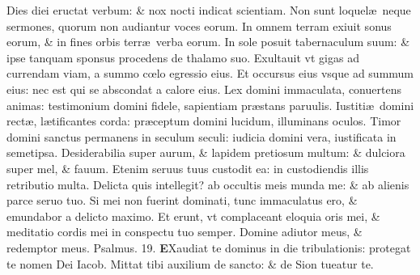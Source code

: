 \documentclass[a5paper,10pt]{book}
\def\ae{æ}
\def\oe{œ}
\begin{document}
\begin{multicols*}{2}
\newline \color{red} D\color{black}ies diei eructat verbum: \& nox nocti indicat scientiam.
\newline \color{red} N\color{black}on sunt loquel\ae \ neque sermones, quorum non audiantur voces eorum.
\newline \color{red} I\color{black}n omnem terram exiuit sonus eorum, \& in fines orbis terr\ae \ verba eorum.
\newline \color{red} I\color{black}n sole posuit tabernaculum suum: \& ipse tanquam sponsus procedens de thalamo suo.
\newline \color{red} E\color{black}xultauit vt gigas ad currendam viam, a summo c\oe lo egressio eius.
\newline \color{red} E\color{black}t occursus eius vsque ad summum eius: nec est qui se abscondat a calore eius.
\newline \color{red} L\color{black}ex domini immaculata, conuertens animas: testimonium domini fidele, sapientiam pr\ae stans paruulis.
\newline \color{red} I\color{black}ustiti\ae \ domini rect\ae , l\ae tificantes corda: pr\ae ceptum domini lucidum, illuminans oculos.
\newline \color{red} T\color{black}imor domini sanctus permanens in seculum seculi: iudicia domini vera, iustificata in semetipsa.
\newline \color{red} D\color{black}esiderabilia super aurum, \& lapidem pretiosum multum: \& dulciora super mel, \& fauum.
\newline \color{red} E\color{black}tenim seruus tuus custodit ea: in custodiendis illis retributio multa.
\newline \color{red} D\color{black}elicta quis intellegit? ab occultis meis munda me: \& ab alienis parce seruo tuo.
\newline \color{red} S\color{black}i mei non fuerint dominati, tunc immaculatus ero, \& emundabor a delicto maximo.
\newline \color{red} E\color{black}t erunt, vt complaceant eloquia oris mei, \& meditatio cordis mei in conspectu tuo semper.
\newline \color{red} D\color{black}omine adiutor meus, \& redemptor meus. \quad \color{red} Psalmus. \hypertarget{ps19}{19.} \color{black}
\lettrine[lines=2]{\bfseries \color{red} E}{}Xaudiat te dominus in die tribulationis: protegat te nomen Dei Iacob.
\newline \color{red} M\color{black}ittat tibi auxilium de sancto: \& de Sion tueatur te.

\end{multicols*}
\end{document}
